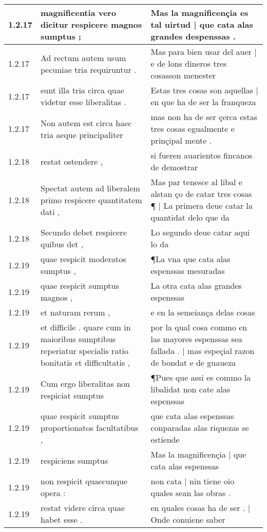 \begin{tabular}{|p{1cm}|p{6.5cm}|p{6.5cm}|}
1.2.17 & magnificentia vero dicitur respicere magnos sumptus ; & Mas la magnificençia es tal uirtud | que cata alas grandes despenssas . \\\hline
1.2.17 & Ad rectum autem usum pecuniae tria requiruntur . & Mas para bien usar del auer | e de lons dineros tres cosasson menester \\\hline
1.2.17 & sunt illa tria circa quae videtur esse liberalitas . & Estas tres cosas son aquellas | en que ha de ser la franqueza \\\hline
1.2.17 & Non autem est circa haec tria aeque principaliter & mas non ha de ser çerca estas tres cosas egualmente e prinçipal mente . \\\hline
1.2.18 & restat ostendere , & si fueren auarientos fincanos de demostrar \\\hline
1.2.18 & Spectat autem ad liberalem primo respicere quantitatem dati , & Mas par tenesce al libal e alstan ço de catar tres cosas ¶ | La primera deue catar la quantidat delo que da \\\hline
1.2.18 & Secundo debet respicere quibus det , & Lo segundo deue catar aqui lo da \\\hline
1.2.19 & quae respicit moderatos sumptus , & ¶La vna que cata alas espenssas mesuradas \\\hline
1.2.19 & quae respicit sumptus magnos , & La otra cata alas grandes espenssas \\\hline
1.2.19 & et naturam rerum , & e en la semeiança delas cosas \\\hline
1.2.19 & et difficile . quare cum in maioribus sumptibus reperiatur specialis ratio bonitatis et difficultatis , & por la qual cosa commo en las mayores espenssas sea fallada . | mas espeçial razon de bondat e de guaueza \\\hline
1.2.19 & Cum ergo liberalitas non respiciat sumptus & ¶Pues que assi es commo la libalidat non cate alas espenssas \\\hline
1.2.19 & quae respicit sumptus proportionatos facultatibus , & que cata alas espenssas conparadas alas riquezas se estiende \\\hline
1.2.19 & respiciens sumptus & Mas la magnificençia | que cata alas espenssas \\\hline
1.2.19 & non respicit quaecunque opera : & non cata | nin tiene oio quales sean las obras . \\\hline
1.2.19 & restat videre circa quae habet esse . & en quales cosas ha de ser . | Onde conuiene saber \\\hline

\end{tabular}
